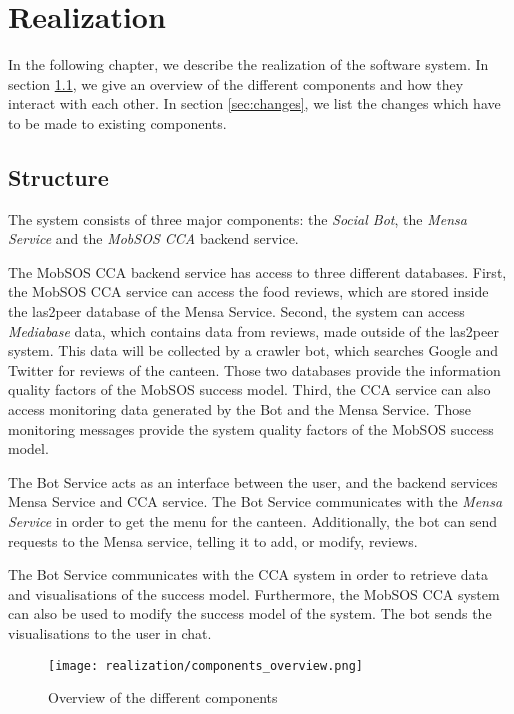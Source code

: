 \chapter{Realization}

In the following chapter, we describe the realization of the software system. In section \ref{sec:structure}, we give an overview of the different components and how they interact with each other. In section \ref{sec:changes}, we list the changes which have to be made to existing components.

\section{Structure}\label{sec:structure}

The system consists of three major components: the \emph{Social Bot}, the \emph{Mensa Service} and the \emph{MobSOS CCA} backend service.

The MobSOS CCA backend service has access to three different databases. First, the MobSOS CCA service can access the food reviews, which are stored inside the las2peer database of the Mensa Service. Second, the system can access \emph{Mediabase} data, which contains data from reviews, made outside of the las2peer system. This data will be collected by a crawler bot, which searches Google and Twitter for reviews of the canteen. Those two databases provide the information quality factors of the MobSOS success model.
Third, the CCA service can also access monitoring data generated by the Bot and the Mensa Service. Those monitoring messages provide the system quality factors of the MobSOS success model.

The Bot Service acts as an interface between the user, and the backend services Mensa Service and CCA service.
The Bot Service communicates with the \emph{Mensa Service} in order to get the menu for the canteen. Additionally, the bot can send requests to the Mensa service, telling it to add, or modify, reviews.

The Bot Service communicates with the CCA system in order to retrieve data and visualisations of the success model. Furthermore, the MobSOS CCA system can also be used to modify the success model of the system. The bot sends the visualisations to the user in chat.

\begin{figure}[h]
  \centering
  \texttt{[image: realization/components\_overview.png]}
  \caption{Overview of the different components}
  \label{fig:componentsOverview}
\end{figure}

